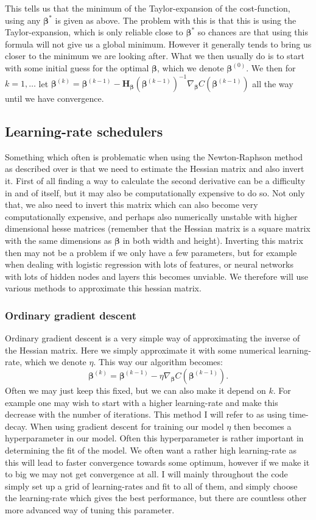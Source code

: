 \documentclass{article}
\begin{document}
This tells us that the minimum of the Taylor-expansion of the cost-function,
using any $\bm{\beta}^*$ is given as above. The problem with this is that this
is using the Taylor-expansion, which is only reliable close to $\bm{\beta}^*$ so
chances are that using this formula will not give us a global minimum. However
it generally tends to bring us closer to the minimum we are looking after. What
we then usually do is to start with some initial guess for the optimal
$\bm{\beta}$, which we denote $\bm{\beta}^{(0)}$. We then for $k=1, \dots$ let
$\bm{\beta}^{(k)} = \bm{\beta}^{(k-1)} -
      \bm{H}_{\bm{\beta}}(\bm{\beta}^{(k-1)})^{-1} \nabla_{\bm{\beta}}
      C(\bm{\beta}^{(k-1)})$ all the way until we have convergence.

\subsection{Learning-rate schedulers}
Something which often is problematic when using the Newton-Raphson method as
described over is that we need to estimate the Hessian matrix and also invert
it. First of all finding a way to calculate the second derivative can be a
difficulty in and of itself, but it may also be computationally expensive to do
so. Not only that, we also need to invert this matrix which can also become very
computationally expensive, and perhaps also numerically unstable with higher
dimensional hesse matrices (remember that the Hessian matrix is a square matrix
with the same dimensions as $\bm{\beta}$ in both width and height).  Inverting
this matrix then may not be a problem if we only have a few parameters, but for
example when dealing with logistic regression with lots of features, or neural
networks with lots of hidden nodes and layers this becomes unviable. We
therefore will use various methods to approximate this hessian matrix.

\subsubsection{Ordinary gradient descent}
Ordinary gradient descent is a very simple way of approximating the inverse of
the Hessian matrix. Here we simply approximate it with some numerical
learning-rate, which we denote $\eta$. This way our algorithm becomes:
$$\bm{\beta}^{(k)} = \bm{\beta}^{(k-1)} - \eta \nabla_{\bm{\beta}} C(\bm{\beta}^{(k-1)}).$$
Often we may just keep this fixed, but we can also make it depend on $k$. For
example one may wish to start with a higher learning-rate and make this decrease
with the number of iterations. This method I will refer to as using time-decay.
When using gradient descent for training our model $\eta$ then becomes a
hyperparameter in our model. Often this hyperparameter is rather important in
determining the fit of the model. We often want a rather high learning-rate as
this will lead to faster convergence towards some optimum, however if we make it
to big we may not get convergence at all. I will mainly throughout the code
simply set up a grid of learning-rates and fit to all of them, and simply choose
the learning-rate which gives the best performance, but there are countless
other more advanced way of tuning this parameter.
\end{document}
